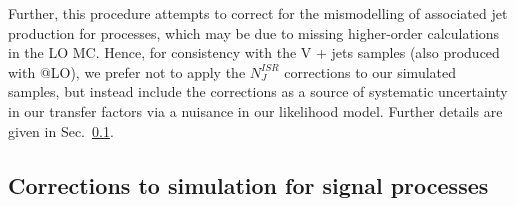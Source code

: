 Further, this procedure attempts to correct for the mismodelling of
associated jet production for \ttbar processes, which may be due to
missing higher-order calculations in the LO \MADGRAPH MC. Hence, for
consistency with the V + jets samples (also produced with
\MADGRAPH{}@LO), we prefer not to apply the $N_J^{ISR}$ corrections to
our simulated samples, but instead include the corrections as a source
of systematic uncertainty in our transfer factors via a nuisance in
our likelihood model. Further details are given in Sec.~\ref{}.

\subsection{Corrections to simulation for signal processes}


